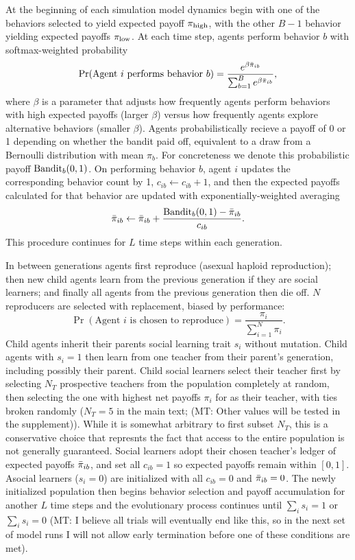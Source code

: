 \documentclass[letterpaper,11.5pt]{scrartcl}
\newcommand{\mt}[1]{{\textcolor{myorange} {({\tiny MT:} #1)}}}
\begin{document}
At the beginning of each simulation model dynamics begin with 
one of the behaviors selected to 
yield expected payoff $\pi_{\mathrm{high}}$, with the other $B-1$ behavior yielding
expected payoffs $\pi_{\mathrm{low}}$. At each time step, agents perform behavior $b$ 
with softmax-weighted probability
\begin{equation}
  \Pr(\text{Agent $i$ performs behavior $b$}) = 
    \frac{e^{\beta \bar\pi_{ib}}}{\sum_{b=1}^B e^{\beta \bar\pi_{ib}}},
\end{equation}
\noindent
where $\beta$ is a parameter that adjusts how frequently agents perform 
behaviors with high expected payoffs (larger $\beta$) versus how frequently
agents explore alternative behaviors (smaller $\beta$). 
Agents probabilistically recieve a payoff of 0 or 1 depending on whether the
bandit paid off, equivalent to a draw from a Bernoulli distribution with 
mean $\pi_b$. For concreteness we denote this probabilistic payoff
$\text{Bandit}_b(0, 1)$. On performing behavior $b$, agent $i$ updates the
corresponding behavior count by 1, $c_{ib} \leftarrow c_{ib} + 1$, and then
the expected payoffs calculated for that behavior are updated with
exponentially-weighted averaging
\begin{equation}
  \bar\pi_{ib} \leftarrow \bar\pi_{ib} + \frac{\text{Bandit}_b(0, 1) - \bar\pi_{ib}}{c_{ib}}.
\end{equation}
\noindent
This procedure continues for $L$ time steps within each generation.

In between generations agents first reproduce (asexual haploid reproduction); 
then new child agents learn from the
previous generation if they are social learners; and finally all agents from the
previous generation then die off. $N$ reproducers are selected with replacement, 
biased by performance:
\begin{equation}
  \Pr(\text{Agent $i$ is chosen to reproduce}) = \frac{\pi_i}{\sum_{i=1}^N \pi_i}.
\end{equation}
\noindent
Child agents inherit their parents social learning trait $s_i$ without mutation.
Child agents with $s_i = 1$ then learn from one teacher from their parent's
generation, including possibly their parent. Child social learners select
their teacher first by selecting $N_T$ prospective teachers from the 
population completely at random, then selecting the one with highest
net payoffs $\pi_i$ for as their teacher, with ties broken randomly 
($N_T = 5$ in the main text;
\mt{Other values will be tested in the supplement}). While it is somewhat
arbitrary to first subset $N_T$, this is a conservative choice that
represnts the fact that access to the entire population is not generally
guaranteed. Social learners adopt their chosen teacher's ledger of 
expected payoffs $\bar\pi_{ib}$, and set
all $c_{ib} = 1$ so expected payoffs remain within $[0, 1]$. 
Asocial learners ($s_i = 0$) are initialized with all $c_{ib} = 0$ and
$\bar\pi_{ib} = 0$. The newly initialized population then begins behavior selection
and payoff accumulation for another $L$ time steps and the evolutionary process
continues until $\sum_i s_i = 1$ or $\sum_i s_i = 0$ \mt{I believe
all trials will eventually end like this, so in the next set of model runs I will
not allow early termination before one of these conditions are met}.
\end{document}
